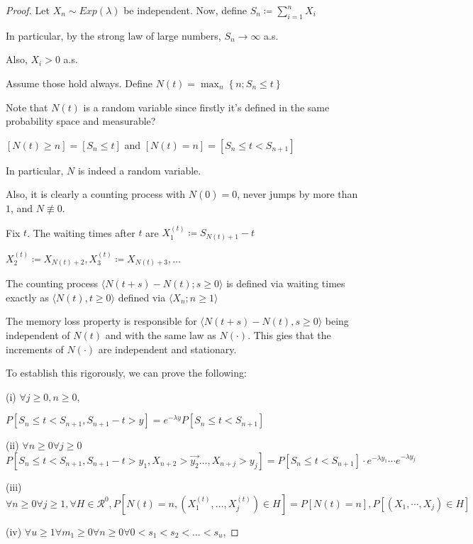 \documentclass{article}
\theoremstyle{definition}
\begin{document}
\begin{proof}
    Let \(X_n \sim Exp(\lambda)\) be independent. Now, define \(S_n \coloneqq \displaystyle \sum_{i=1}^{n} X_i \) 

    In particular, by the strong law of large numbers, \(S_n \to \infty\) a.s.

    Also, \(X_i > 0\) a.s.
    
    Assume those hold always. Define \(N(t)=\max_n \left\{ n; S_n\leq t \right\} \)

    Note that \(N(t)\) is a random variable since firstly it's defined in the same probability space and measurable?

    \([N(t) \geq n]=[S_n \leq t]\) and \([N(t)=n]=[S_n \leq t < S_{n+1}]\)

    In particular, \(N\) is indeed a random variable.

    Also, it is clearly a counting process with \(N(0)=0\), never jumps by more than \(1\), and \(N \not\equiv 0\).
    
    Fix \(t\). The waiting times after \(t\) are \(X_1^{(t)}\coloneqq S_{N(t)+1}-t\)
    
    \(X_2^{(t)}\coloneqq X_{N(t)+2},X_3^{(t)}\coloneqq X_{N(t)+3},\dots \)
    
    The counting process \(\langle N(t+s) - N(t) ; s\geq 0 \rangle \) is defined via waiting times exactly as \(\langle N(t), t\geq 0 \rangle \) defined via \(\langle X_n; n\geq 1 \rangle \) 
    
    The memory loss property is responsible for \(\langle N(t+s)-N(t), s\geq 0 \rangle \) being independent of \(N(t)\) and with the same law as \(N(\cdot)\). This gies that the increments of \(N(\cdot)\) are independent and stationary.
    
    To establish this rigorously, we can prove the following:

    (i) \(\forall j\geq 0, n \geq 0\),

    \(P[S_n \leq t < S_{n+1},S_{n+1}-t>y]=e^{-\lambda y} P[S_n \leq t < S_{n+1}]\) 

    (ii) \(\forall n \geq 0 \forall j\geq 0\) \(P[S_n \leq t < S_{n+1},S_{n+1}-t > y_1, X_{n+2}>\vec{y_2} \dots ,X_{n+j} > y_j]=P[S_n \leq t < S_{n+1}]\cdot e^{-\lambda y_1}\cdots e^{-\lambda y_j} \)  

    (iii) \(\forall n \geq 0 \forall j \geq 1, \forall H\in \mathcal{R} ^0, P[N(t)=n,(X_1^{(t)},\dots ,X_j^{(t)})\in H]=P[N(t)=n],P[(X_1,\cdots,X_j)\in H]\) 

    (iv) \(\forall u\geq 1 \forall  m_1 \geq 0 \forall  n\geq  0 \forall 0 < s_1 < s_2 < \dots < s_u\),


\end{proof}
\end{document}
